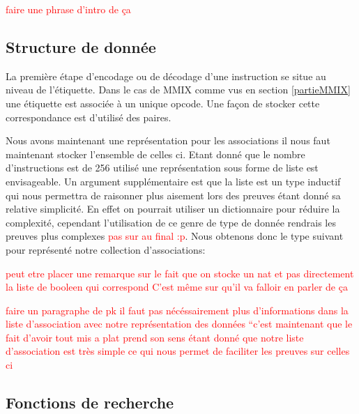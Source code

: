 \documentclass {article}
\newcommand{\codefrom}[3]
           {}
\theoremstyle{definition}
\theoremstyle{remark}
\newcommand{\todo}[1]{\textcolor{red}{#1}}
\begin{document}
\todo{faire une phrase d'intro de ça}


\subsection{Structure de donnée}
\label{Structure de donnee}
La première étape d'encodage ou de décodage d'une instruction se situe
au niveau de l'étiquette. Dans le cas de MMIX comme vus en section \ref{partieMMIX}
une étiquette est associée à un unique opcode. Une façon de stocker cette
correspondance est d'utilisé des paires.
\codefrom{src}{association_list}{assoc}

Nous avons maintenant une représentation pour les associations il nous faut
maintenant stocker l'ensemble de celles ci. Etant donné que le nombre
d'instructions est de 256 utilisé une représentation sous forme
de liste est envisageable. Un argument supplémentaire est que la liste
est un type inductif qui nous permettra de raisonner plus aisement
lors des preuves étant donné sa relative simplicité. En effet on pourrait utiliser
un dictionnaire pour réduire la complexité, cependant l'utilisation de ce genre
de type de donnée rendrais les preuves plus complexes \todo{pas sur au final :p}.
Nous obtenons donc le type suivant pour représenté notre collection d'associations:

\codefrom{src}{association_list}{tag_opcode_assoc}


\todo{peut etre placer une remarque sur le fait que on stocke un nat et pas directement
  la liste de booleen qui correspond}
\todo{C'est même sur qu'il va falloir en parler de ça}


\todo{faire un paragraphe de pk il faut pas nécéssairement plus d'informations dans la liste
  d'association avec notre représentation des données ``c'est maintenant que le fait d'avoir tout mis a plat prend son sens
étant donné que notre liste d'association est très simple ce qui nous permet de faciliter les preuves sur celles ci}


\subsection{Fonctions de recherche}
\end{document}
